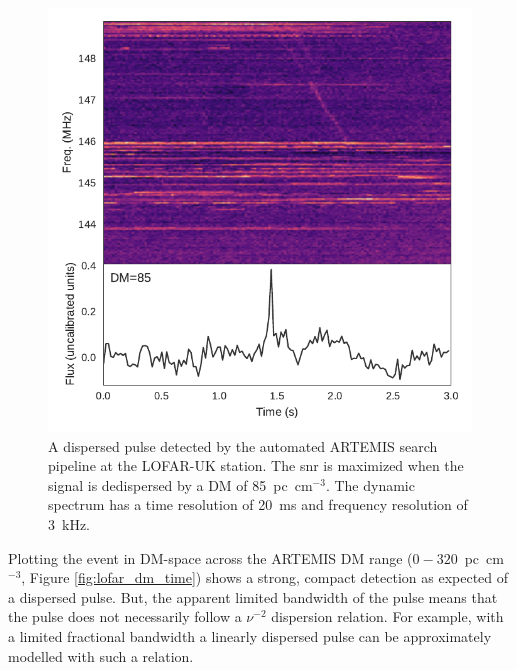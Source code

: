 \documentclass[a4paper,fleqn,usenatbib]{mnras}
\begin{document}
\begin{figure}
    \includegraphics[width=1.0\linewidth]{figures/LOFAR_dynamic.pdf}
    \caption{A dispersed pulse detected by the automated ARTEMIS search pipeline
    at the LOFAR-UK station. The \gls{snr} is maximized when the signal is
    dedispersed by a DM of 85~pc~cm$^{-3}$. The dynamic spectrum has a time
    resolution of 20~ms and frequency resolution of 3~kHz.
    }
    \label{fig:lofar_dynamic}
\end{figure}

Plotting the event in DM-space across the ARTEMIS DM range
($0-320$~pc~cm$^{-3}$, Figure \ref{fig:lofar_dm_time}) shows a strong, compact
detection as expected of a dispersed pulse. But, the apparent limited bandwidth
of the pulse means that the pulse does not necessarily follow a $\nu^{-2}$
dispersion relation. For example, with a limited fractional bandwidth a linearly
dispersed pulse can be approximately modelled with such a relation.
\end{document}
